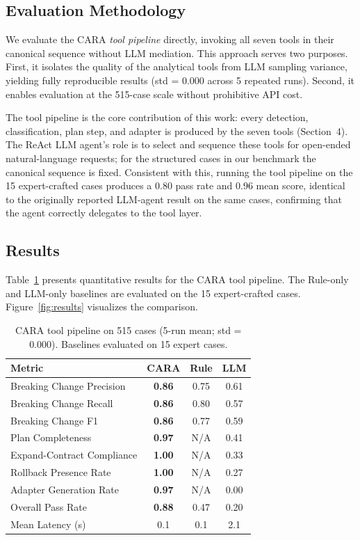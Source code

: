 \documentclass[10pt,twocolumn]{article}
\begin{document}
\subsection{Evaluation Methodology}

We evaluate the CARA \emph{tool pipeline} directly, invoking all seven tools in
their canonical sequence without LLM mediation. This approach serves two
purposes. First, it isolates the quality of the analytical tools from LLM
sampling variance, yielding fully reproducible results (std = 0.000 across 5
repeated runs). Second, it enables evaluation at the 515-case scale without
prohibitive API cost.

The tool pipeline is the core contribution of this work: every detection,
classification, plan step, and adapter is produced by the seven tools
(Section~4). The ReAct LLM agent's role is to select and sequence these tools
for open-ended natural-language requests; for the structured cases in our
benchmark the canonical sequence is fixed. Consistent with this, running the
tool pipeline on the 15 expert-crafted cases produces a 0.80 pass rate and
0.96 mean score, identical to the originally reported LLM-agent result on the
same cases, confirming that the agent correctly delegates to the tool layer.

\subsection{Results}

Table~\ref{tab:results} presents quantitative results for the CARA tool
pipeline. The Rule-only and LLM-only baselines are evaluated on the 15
expert-crafted cases. Figure~\ref{fig:results} visualizes the comparison.

\begin{table}[h]
\centering
\caption{CARA tool pipeline on 515 cases (5-run mean; std = 0.000). Baselines evaluated on 15 expert cases.}
\label{tab:results}
\small
\setlength{\tabcolsep}{3pt}
\begin{tabular}{lccc}
\toprule
\textbf{Metric} & \textbf{CARA} & \textbf{Rule} & \textbf{LLM} \\
\midrule
Breaking Change Precision & \textbf{0.86} & 0.75 & 0.61 \\
Breaking Change Recall    & \textbf{0.86} & 0.80 & 0.57 \\
Breaking Change F1        & \textbf{0.86} & 0.77 & 0.59 \\
\midrule
Plan Completeness         & \textbf{0.97} & N/A  & 0.41 \\
Expand-Contract Compliance & \textbf{1.00} & N/A & 0.33 \\
Rollback Presence Rate    & \textbf{1.00} & N/A  & 0.27 \\
\midrule
Adapter Generation Rate   & \textbf{0.97} & N/A  & 0.00 \\
Overall Pass Rate         & \textbf{0.88} & 0.47 & 0.20 \\
\midrule
Mean Latency (s)          & 0.1           & 0.1  & 2.1  \\
\bottomrule
\end{tabular}
\end{table}
\end{document}
